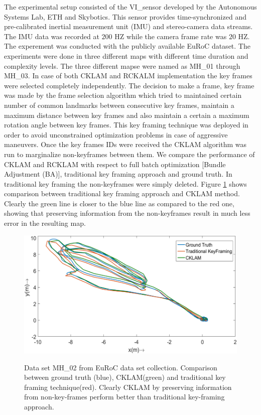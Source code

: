 The experimental setup consisted of the VI\_sensor \cite{6906892} developed by the Autonomous Systems Lab, ETH and Skybotics. This sensor provides time-synchronized and pre-calibrated inertial measurement unit (IMU) and stereo-camera data streams. The IMU data was recorded at $200$ HZ while the camera frame rate was $20$ HZ. The experement was conducted with the publicly available EuRoC \cite{Burri25012016} dataset. The experiments were done in three different maps with different time duration and complexity levels. The three different mapse were named as MH\_01 through MH\_03. In case of both CKLAM and RCKALM implementation the key frames were selected completely independently. The decision to make a frame, key frame was made by the frame selection algorithm which tried to maintained certain number of common landmarks between consecutive key frames, maintain a maximum distance between key frames and also maintain a certain a maximum rotation angle between key frames. This key framing technique was deployed in order to avoid unconstrained optimization problems in case of aggressive maneuvers. Once the key frames IDs were received the CKLAM algorithm was run to marginalize non-keyframes between them. We compare the performance of CKLAM and RCKLAM with respect to full batch optimization [Bundle Adjustment (BA)], traditional key framing approach and ground truth. In traditional key framing the non-keyframes were simply deleted. Figure \ref{fig:CKLAMvsGT} shows comparison between traditional key framing approach and CKLAM method. Clearly the green line is closer to the blue line as compared to the red one, showing that preserving information from the non-keyframes result in much less error in the resulting map.

\begin{figure}
	\centering
		\includegraphics[width=1.00\textwidth]{images/CKLAMvsGT.png}
	\label{fig:CKLAMvsGT}
  \caption{Data set MH\_02 from EuRoC \cite{Burri25012016} data set collection. Comparison between ground truth (blue), CKLAM(green) and traditional key framing technique(red). Clearly CKLAM by preserving information from non-key-frames perform better than traditional key-framing approach.}
\end{figure}

